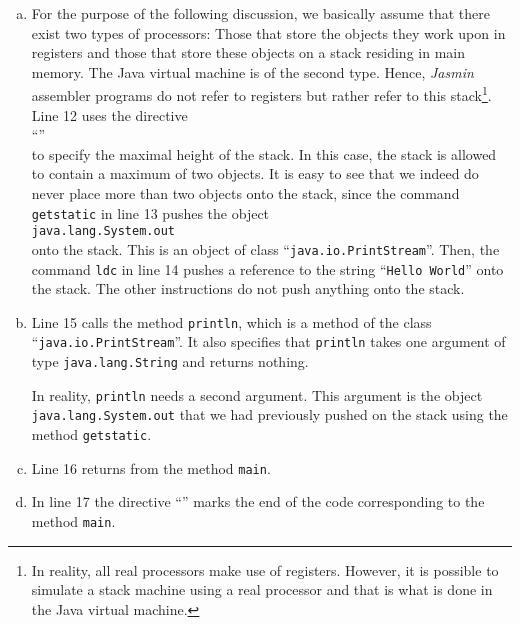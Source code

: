 \begin{enumerate}
\begin{enumerate}[(a)]
  \item For the purpose of the following discussion, we basically assume that there exist two types of
        processors: Those that store the objects they work upon in registers and those that store
        these objects on a stack residing in main memory.  The Java virtual machine is of the second
        type.  Hence, \textsl{Jasmin} assembler programs do not refer to registers but rather refer to
        this stack\footnote{
          In reality, all real processors make use of registers.  However, it is possible 
          to simulate a stack machine using a real processor and that is what is done in the Java
          virtual machine.}.
        Line 12 uses the directive
        \\[0.2cm]
        \hspace*{1.3cm}
        ``\texttt{}''
        \\[0.2cm]
        to specify the maximal height of the
        stack.  In this case, the stack is allowed to contain a maximum of two objects.  It is easy
        to see that we indeed do never place more than two objects onto the stack, since the command
        \texttt{getstatic} in line 13 pushes the object 
        \\[0.2cm]
        \hspace*{1.3cm}
        \texttt{java.lang.System.out}
        \\[0.2cm]
        onto the stack.  This is an object of class ``\texttt{java.io.PrintStream}''.
        Then, the command \texttt{ldc} in line 14 pushes a reference to the string ``\texttt{Hello World}'' onto the stack.
        The other instructions do not push anything onto the stack.
  \item Line 15 calls the method \texttt{println}, which is a method of the class
        ``\texttt{java.io.PrintStream}''.  It also specifies that \texttt{println} takes one argument of
        type \texttt{java.lang.String} and returns nothing.

        In reality, \texttt{println} needs a second argument.  This argument is the object
        \texttt{java.lang.System.out} that we had previously pushed on the stack using the method \texttt{getstatic}.
  \item Line 16 returns from the method \texttt{main}.
  \item In line 17 the directive ``\texttt{}''  marks the end of the code corresponding to the method 
        \texttt{main}.
  \end{enumerate}
\end{enumerate}
